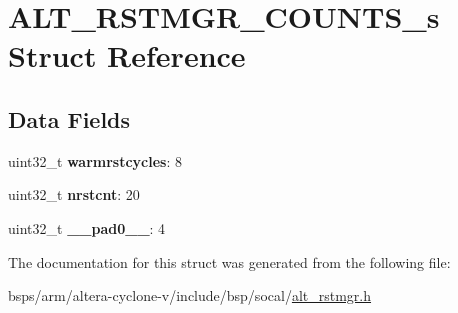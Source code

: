 \hypertarget{structALT__RSTMGR__COUNTS__s}{}\section{A\+L\+T\+\_\+\+R\+S\+T\+M\+G\+R\+\_\+\+C\+O\+U\+N\+T\+S\+\_\+s Struct Reference}
\label{structALT__RSTMGR__COUNTS__s}
\subsection*{Data Fields}
\begin{DoxyCompactItemize}
\item 
\mbox{\label{structALT__RSTMGR__COUNTS__s_aceab0c4c04c59f413e7aaf8d343c2384}} 
uint32\+\_\+t {\bfseries warmrstcycles}\+: 8
\item 
\mbox{\label{structALT__RSTMGR__COUNTS__s_abe789b9187aae3c363ca44965a1915fd}} 
uint32\+\_\+t {\bfseries nrstcnt}\+: 20
\item 
\mbox{\label{structALT__RSTMGR__COUNTS__s_aecc4cebd547202e77d00e22229a34cd3}} 
uint32\+\_\+t {\bfseries \+\_\+\+\_\+pad0\+\_\+\+\_\+}\+: 4
\end{DoxyCompactItemize}


The documentation for this struct was generated from the following file\+:\begin{DoxyCompactItemize}
\item 
bsps/arm/altera-\/cyclone-\/v/include/bsp/socal/\mbox{\hyperlink{alt__rstmgr_8h}{alt\+\_\+rstmgr.\+h}}\end{DoxyCompactItemize}
